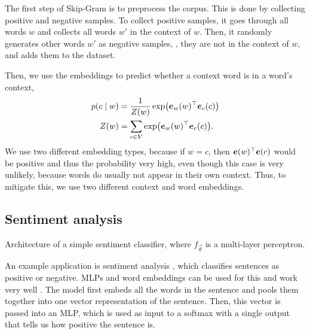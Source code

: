 The first step of Skip-Gram is to preprocess the corpus. This is done by
collecting positive and negative samples. To collect positive samples,
it goes through all words $w$ and collects all words $w'$ in the context of
$w$. Then, it randomly generates other words $w'$ as negative samples, \ie,
they are not in the context of $w$, and adds them to the dataset.

Then, we use the embeddings to predict whether a context word is in a word's
context,
\begin{align*}
    p(c\mid w) & = \frac{1}{Z(w)} \exp \lft( \transpose{\vec{e}_w(w)} \vec{e}_c(c) \rgt)  \\
    Z(w)       & = \sum_{c \in V} \exp \lft( \transpose{\vec{e}_w(w)} \vec{e}_c(c) \rgt).
\end{align*}
We use two different embedding types, because if $w=c$, then
$\bm{e}(w)^\top \bm{e}(c)$ would be positive and thus the probability
very high, even though this case is very unlikely, because words do usually not
appear in their own context. Thus, to mitigate this, we use two different
context and word embeddings.

\subsection{Sentiment analysis}

\begin{marginfigure}
    \centering
    \caption{Architecture of a simple sentiment classifier, where
        $f_{\vec{\theta}}$ is a multi-layer perceptron.}
    \label{fig:sentiment-analysis}
\end{marginfigure}

An example application is sentiment analysis \citep{pang2008opinion}, which
classifies sentences as positive or negative. MLPs and word embeddings can be
used for this and work very well \citep{iyyer2015deep}. The model first embeds
all the words in the sentence and pools them together into one vector
representation of the sentence. Then, this vector is
passed into an MLP, which is used as input to a softmax with a single output
that tells us how positive the sentence is.
